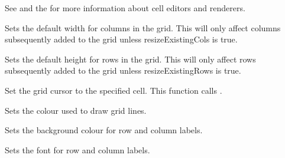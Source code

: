 See  and
the  for more information about cell editors and renderers.



\label{wxgridsetdefaultcolsize}


Sets the default width for columns in the grid. This will only affect columns subsequently added to
the grid unless resizeExistingCols is true.



\label{wxgridsetdefaultrowsize}


Sets the default height for rows in the grid. This will only affect rows subsequently added
to the grid unless resizeExistingRows is true.



\label{wxgridsetgridcursor}


Set the grid cursor to the specified cell.
This function calls .



\label{wxgridsetgridlinecolour}


Sets the colour used to draw grid lines.



\label{wxgridsetlabelbackgroundcolour}


Sets the background colour for row and column labels.



\label{wxgridsetlabelfont}


Sets the font for row and column labels.



